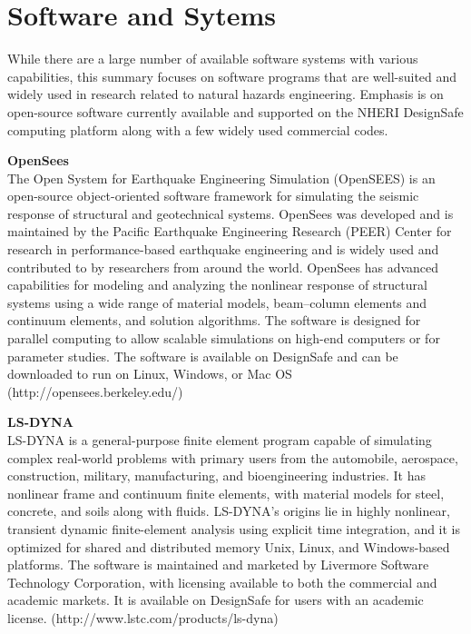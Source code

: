 \section{Software and Sytems}
\label{sec:resp_struct_tools}

While there are a large number of available software systems with various capabilities, this summary focuses on software programs that are well-suited and widely used in research related to natural hazards engineering. Emphasis is on open-source software currently available and supported on the NHERI DesignSafe computing platform along with a few widely used commercial codes.
\newline

\noindent\textbf{OpenSees} \\The Open System for Earthquake Engineering Simulation (OpenSEES) is an open-source object-oriented software framework for simulating the seismic response of structural and geotechnical systems. OpenSees was developed and is maintained by the Pacific Earthquake Engineering Research (PEER) Center for research in performance-based earthquake engineering and is widely used and contributed to by researchers from around the world. OpenSees has advanced capabilities for modeling and analyzing the nonlinear response of structural systems using a wide range of material models, beam–column elements and continuum elements, and solution algorithms. The software is designed for parallel computing to allow scalable simulations on high-end computers or for parameter studies. The software is available on DesignSafe and can be downloaded to run on Linux, Windows, or Mac OS (http://opensees.berkeley.edu/)
\newline

\noindent\textbf{LS-DYNA} \\LS-DYNA is a general-purpose finite element program capable of simulating complex real-world problems with primary users from the automobile, aerospace, construction, military, manufacturing, and bioengineering industries. It has nonlinear frame and continuum finite elements, with material models for steel, concrete, and soils along with fluids. LS-DYNA’s origins lie in highly nonlinear, transient dynamic finite-element analysis using explicit time integration, and it is optimized for shared and distributed memory Unix, Linux, and Windows-based platforms. The software is maintained and marketed by Livermore Software Technology Corporation, with licensing available to both the commercial and academic markets. It is available on DesignSafe for users with an academic license. (http://www.lstc.com/products/ls-dyna) 
\newline

